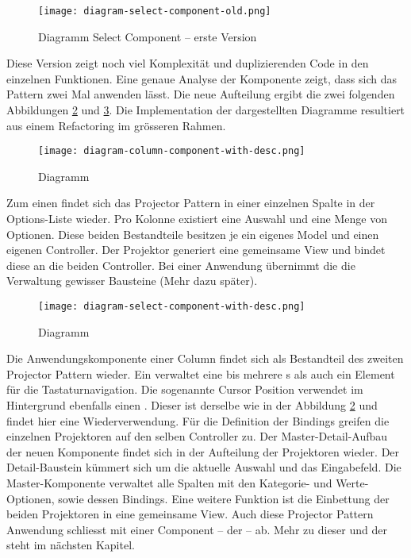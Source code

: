 \begin{figure}[!htb]
    \centering
    \texttt{[image: diagram-select-component-old.png]}
    \caption{\centering Diagramm Select Component – erste Version}
    \label{img:diagramSelectComponentOld}
\end{figure}

Diese Version zeigt noch viel Komplexität und duplizierenden Code in den einzelnen Funktionen. 
Eine genaue Analyse der Komponente zeigt, dass sich das Pattern zwei Mal anwenden lässt. 
Die neue Aufteilung ergibt die zwei folgenden Abbildungen \ref{img:diagramColumnComponent} und \ref{img:diagramSelectComponent}. 
Die Implementation der dargestellten Diagramme resultiert aus einem Refactoring im grösseren Rahmen. 

\begin{figure}[!htb]
    \centering
    \texttt{[image: diagram-column-component-with-desc.png]}
    \caption{\centering Diagramm }
    \label{img:diagramColumnComponent}
\end{figure}

Zum einen findet sich das Projector Pattern in einer einzelnen Spalte in der Options-Liste wieder. 
Pro Kolonne existiert eine Auswahl und eine Menge von Optionen. 
Diese beiden Bestandteile besitzen je ein eigenes Model und einen eigenen Controller. 
Der Projektor generiert eine gemeinsame View und bindet diese an die beiden Controller. 
Bei einer Anwendung übernimmt die  die Verwaltung gewisser Bausteine (Mehr dazu später). 

\begin{figure}[!htb]
    \centering
    \texttt{[image: diagram-select-component-with-desc.png]}
    \caption{\centering Diagramm }
    \label{img:diagramSelectComponent}
\end{figure}

Die Anwendungskomponente einer Column findet sich als Bestandteil des zweiten Projector Pattern wieder. 
Ein  verwaltet eine bis mehrere s als auch ein Element für die Tastaturnavigation. 
Die sogenannte Cursor Position verwendet im Hintergrund ebenfalls einen . 
Dieser ist derselbe wie in der Abbildung \ref{img:diagramColumnComponent} und findet hier eine Wiederverwendung. 
Für die Definition der Bindings greifen die einzelnen Projektoren auf den selben Controller zu. 
Der Master-Detail-Aufbau der neuen Komponente findet sich in der Aufteilung der Projektoren wieder. 
Der Detail-Baustein kümmert sich um die aktuelle Auswahl und das Eingabefeld. 
Die Master-Komponente verwaltet alle Spalten mit den Kategorie- und Werte-Optionen, sowie dessen Bindings. 
Eine weitere Funktion ist die Einbettung der beiden Projektoren in eine gemeinsame View. 
Auch diese Projector Pattern Anwendung schliesst mit einer Component – der  – ab. 
Mehr zu dieser und der  steht im nächsten Kapitel. 


